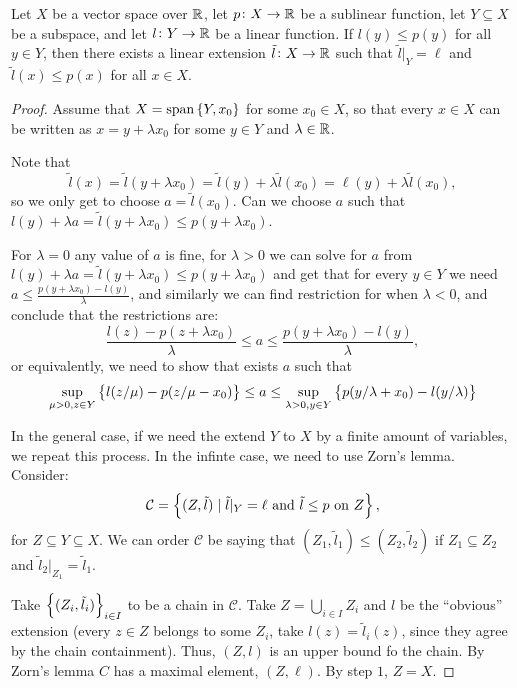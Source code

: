 \documentclass[11pt,a4paper]{article}
\begin{document}
\begin{theorem}
  Let $X$ be a vector space over $\mathbb{R}$,
  let $p \colon X \to \mathbb{R}$ be a sublinear function,
  let $Y \subseteq X$ be a subspace,
  and let $l \colon Y \to \mathbb{R}$ be a linear function.
  If $l(y) \le p(y)$ for all $y \in Y$,
  then there exists a linear extension $\tilde l \colon X \to \mathbb{R}$
  such that $\tilde l\vert_Y = \ell$ and $\tilde l(x) \le p(x)$ for all $x \in X$.
\end{theorem}
\begin{proof}
  Assume that $X = \operatorname{span}\left\{Y,x_0\right\}$ for some $x_0 \in X$,
  so that every $x \in X$ can be written as $x = y + \lambda x_0$
  for some $y \in Y$ and $\lambda \in \mathbb{R}$.

  Note that
  \[
    \tilde l(x) =
    \tilde l(y + \lambda x_0) =
    \tilde l(y) + \lambda \tilde l(x_0) =
    \ell(y) + \lambda \tilde l(x_0),
  \]
  so we only get to choose $a = \tilde l(x_0)$.
  Can we choose $a$ such that $l(y) + \lambda a = \tilde l(y + \lambda x_0)
  \le p(y + \lambda x_0)$.

  For $\lambda = 0$ any value of $a$ is fine,
  for $\lambda > 0$ we can solve for $a$ from
  $l(y) + \lambda a = \tilde l(y + \lambda x_0) \le p(y + \lambda x_0)$
  and get that for every $y \in Y$ we need
  $a \le \frac{p(y + \lambda x_0) - l(y)}{\lambda}$,
  and similarly we can find restriction for when $\lambda < 0$,
  and conclude that the restrictions are:
  \[
    \frac{l(z) - p(z + \lambda x_0)}{\lambda}
    \le a \le
    \frac{p(y + \lambda x_0) - l(y)}{\lambda},
  \]
  or equivalently, we need to show that exists $a$ such that
  \[
    \sup_{\mu > 0,z \in Y}\left\{l(z/\mu) - p(z/\mu - x_0)\right\}
    \le a \le
    \sup_{\lambda > 0,y \in Y}\left\{p(y/\lambda + x_0) - l(y/\lambda)\right\}
  \]

  In the general case, if we need the extend $Y$ to $X$ by a finite
  amount of variables, we repeat this process.
  In the infinte case, we need to use Zorn's lemma.
  Consider:
  \[
    \mathcal C = \left\{(Z,\tilde l) \mid \tilde l\vert_Y = \ell \text{ and } \tilde l \le p \text{ on }Z\right\},
  \]
  for $Z \subseteq Y \subseteq X$.
  We can order $\mathcal C$ be saying that
  $(Z_1,\tilde l_1) \le (Z_2,\tilde l_2)$ if $Z_1 \subseteq Z_2$
  and $\tilde l_2\vert_{Z_1} = \tilde l_1$.

  Take $\left\{(Z_i,\tilde l_i)\right\}_{i \in I}$ to be a chain in $\mathcal C$.
  Take $Z = \bigcup_{i \in I} Z_i$ and $l$ be the ``obvious''
  extension (every $z \in Z$ belongs to some $Z_i$,
  take $l(z) = \tilde l_i(z)$, since they agree by the chain containment).
  Thus, $(Z,l)$ is an upper bound fo the chain.
  By Zorn's lemma $C$ has a maximal element, $(Z, \ell)$.
  By step $1$, $Z = X$.
\end{proof}
\end{document}
